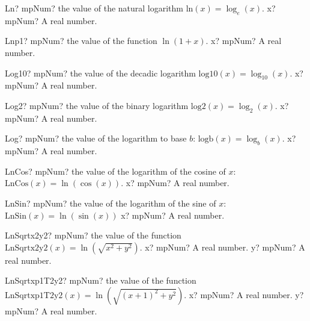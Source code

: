 \documentclass[12pt,a4paper,openany]{book}
\begin{document}
\begin{mpFunctionsExtract}
\mpFunctionOne
{Ln? mpNum? the value of the natural logarithm $\text{ln}(x) = \log_e(x)$.}
{x? mpNum? A real number.}
\end{mpFunctionsExtract}

\begin{mpFunctionsExtract}
\mpFunctionOne
{Lnp1? mpNum? the value of the function $\ln(1+x)$.}
{x? mpNum? A real number.}
\end{mpFunctionsExtract}

\begin{mpFunctionsExtract}
\mpFunctionOne
{Log10? mpNum? the value of the decadic logarithm $\text{log10}(x) = \log_{10}(x)$.}
{x? mpNum? A real number.}
\end{mpFunctionsExtract}

\begin{mpFunctionsExtract}
\mpFunctionOne
{Log2? mpNum? the value of the binary logarithm $\text{log2}(x) = \log_{2}(x)$.}
{x? mpNum? A real number.}
\end{mpFunctionsExtract}

\begin{mpFunctionsExtract}
\mpFunctionOne
{Log? mpNum? the value of the logarithm  to base $b$: $\text{logb}(x) = \log_{b}(x)$.}
{x? mpNum? A real number.}
\end{mpFunctionsExtract}

\begin{mpFunctionsExtract}
\mpFunctionOne
{LnCos? mpNum? the value of the logarithm of the cosine of $x$: $\text{LnCos}(x) =\ln(\cos(x))$.}
{x? mpNum? A real number.}
\end{mpFunctionsExtract}

\begin{mpFunctionsExtract}
\mpFunctionOne
{LnSin? mpNum? the value of the logarithm of the sine of $x$: $\text{LnSin}(x) =\ln(\sin(x))$}
{x? mpNum? A real number.}
\end{mpFunctionsExtract}

\begin{mpFunctionsExtract}
\mpFunctionTwo
{LnSqrtx2y2? mpNum? the value of the function $\text{LnSqrtx2y2}(x) =\ln \left(\sqrt{x^2+y^2} \right)$.}
{x? mpNum? A real number.}
{y? mpNum? A real number.}
\end{mpFunctionsExtract}

\begin{mpFunctionsExtract}
\mpFunctionTwo
{LnSqrtxp1T2y2? mpNum? the value of the function $\text{LnSqrtxp1T2y2}(x) =\ln \left(\sqrt{(x+1)^2+y^2} \right)$.}
{x? mpNum? A real number.}
{y? mpNum? A real number.}
\end{mpFunctionsExtract}
\end{document}
